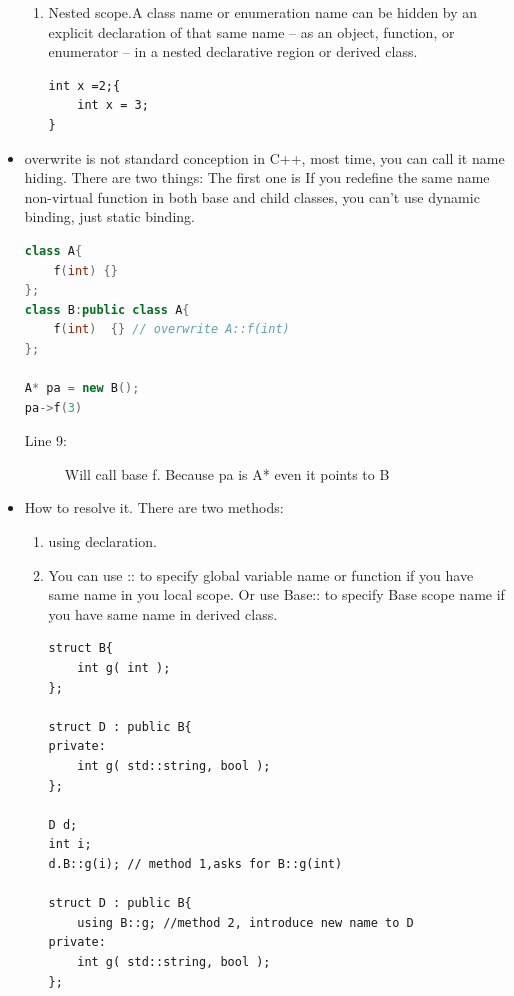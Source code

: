 \documentclass[a4paper,11pt,twoside]{book}
\begin{document}
\begin{itemize}
\begin{enumerate}
		\item Nested scope.A class name or enumeration name can be hidden by an explicit declaration of that same name -- as an object, function, or enumerator -- in a nested declarative region or derived class.
\begin{lstlisting}[numbers=none]
int x =2;{
	int x = 3;
}
\end{lstlisting}
		
	\end{enumerate}
	
	\item overwrite is not standard conception in C++, most time, you can call it name hiding. There are two things: The first one is If you redefine the same name non-virtual function in both base and child classes, you can't use dynamic binding, just static binding. 
\begin{lstlisting}[frame=single, language=c++]
class A{
	f(int) {}
};
class B:public class A{
	f(int)  {} // overwrite A::f(int)
};
	
A* pa = new B();
pa->f(3) 
\end{lstlisting}
\begin{description}
	\item[Line 9:] Will call base f. Because pa is A* even it points to B
\end{description}
	
	\item How to resolve it.  There are two methods:
	\begin{enumerate}
		\item using declaration.
		
		\item You can use :: to specify global variable name or function if you have same name in you local scope.  Or use Base:: to specify Base scope name if you have same name in derived class.
\begin{lstlisting}[numbers=none]
struct B{
	int g( int );
};

struct D : public B{
private:
	int g( std::string, bool );
};

D d; 
int i;
d.B::g(i); // method 1,asks for B::g(int)
		
struct D : public B{ 
	using B::g; //method 2, introduce new name to D
private:
	int g( std::string, bool );
};
\end{lstlisting}
		
	\end{enumerate}
\end{itemize}
\end{document}
